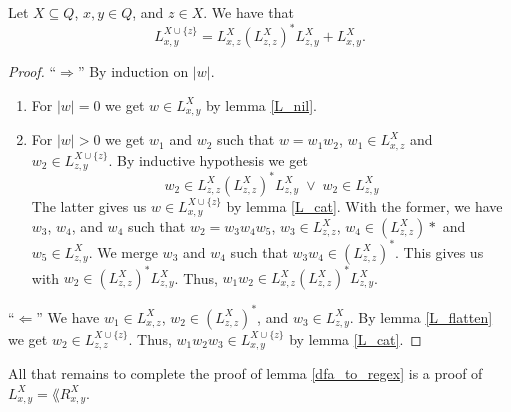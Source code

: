\begin{lemma}
    \label{L_rec}
    Let $X \subseteq Q$, $x,y \in Q$, and $z \in X$.
    We have that 
    \begin{equation*}
        L^{X\cup\{z\}}_{x,y} = L^X_{x,z} (L^X_{z,z})^* L^X_{z,y} + L^X_{x,y}.
    \end{equation*}
\end{lemma}
\begin{proof}
    ``$\Rightarrow$''
    By induction on $|w|$.
    \begin{enumerate}
        \item For $|w| = 0$ we get $w \in L^X_{x,y}$ by lemma \ref{L_nil}. 
        \item For $|w| > 0$ we get $w_1$ and $w_2$ such that $w = w_1 w_2$, $w_1 \in L^X_{x,z}$ and $w_2 \in L^{X\cup\{z\}}_{z,y}$.
            By inductive hypothesis we get 
            \begin{equation*}
             w_2 \in
               L^X_{z,z} (L^X_{z,z})^* L^X_{z,y} \; \vee \; w_2 \in L^X_{z,y}
            \end{equation*}
            The latter gives us $w \in L^{X\cup\{z\}}_{x,y}$ by lemma \ref{L_cat}.
            With the former, we have $w_3$, $w_4$, and $w_4$ such that $w_2 = w_3 w_4 w_5$, $w_3 \in L^{X}_{z,z}$,
            $w_4 \in (L^X_{z,z})*$ and $w_5 \in L^X_{z,y}$.
            We merge $w_3$ and $w_4$ such that $w_3 w_4 \in (L^{X}_{z,z})^*$.
            This gives us with $w_2  \in (L^{X}_{z,z})^* L^X_{z,y}$.
            Thus, $w_1 w_2 \in L^X_{x,z} (L^X_{z,z})^* L^X_{z,y}$.
        \end{enumerate}

    ``$\Leftarrow$''
    We have $w_1 \in L^X_{x,z}$, $w_2 \in (L^X_{z,z})^*$, and $w_3 \in L^X_{z,y}$.
    By lemma \ref{L_flatten} we get $w_2 \in L^{X\cup\{z\}}_{z,z}$.
    Thus, $w_1 w_2 w_3 \in L^{X\cup\{z\}}_{x,y}$ by lemma \ref{L_cat}.
\end{proof}

All that remains to complete the proof of lemma \ref{dfa_to_regex} is a proof of $L^X_{x,y} = \lang{R^X_{x,y}}$.

